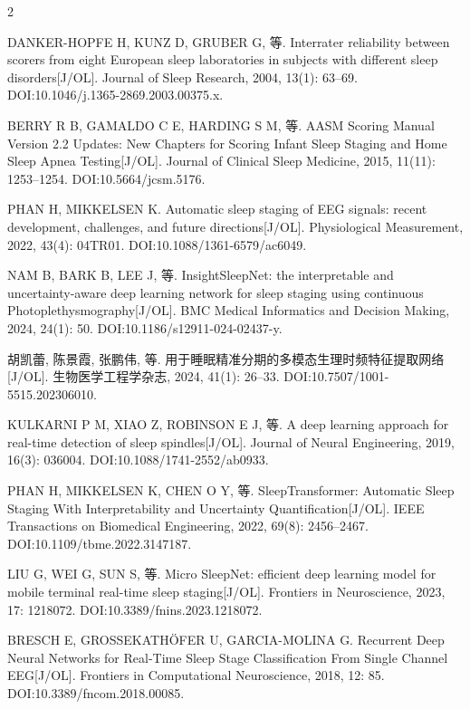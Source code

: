 \documentclass[UTF8,zihao=5,fontset=none]{ctexart}
\begin{document}
\begin{multicols}{2}
{\makebox[25.2pt][l]{[28]}DANKER-HOPFE H, KUNZ D, GRUBER G, 等. Interrater reliability between scorers from eight European sleep laboratories in subjects with different sleep disorders[J/OL]. Journal of Sleep Research, 2004, 13(1): 63--69. DOI:10.1046/j.1365-2869.2003.00375.x.\par
\makebox[25.2pt][l]{[29]}BERRY R B, GAMALDO C E, HARDING S M, 等. AASM Scoring Manual Version 2.2 Updates: New Chapters for Scoring Infant Sleep Staging and Home Sleep Apnea Testing[J/OL]. Journal of Clinical Sleep Medicine, 2015, 11(11): 1253--1254. DOI:10.5664/jcsm.5176.\par
\makebox[25.2pt][l]{[30]}PHAN H, MIKKELSEN K. Automatic sleep staging of EEG signals: recent development, challenges, and future directions[J/OL]. Physiological Measurement, 2022, 43(4): 04TR01. DOI:10.1088/1361-6579/ac6049.\par
\makebox[25.2pt][l]{[31]}NAM B, BARK B, LEE J, 等. InsightSleepNet: the interpretable and uncertainty-aware deep learning network for sleep staging using continuous Photoplethysmography[J/OL]. BMC Medical Informatics and Decision Making, 2024, 24(1): 50. DOI:10.1186/s12911-024-02437-y.\par
\makebox[25.2pt][l]{[32]}胡凯蕾, 陈景霞, 张鹏伟, 等. 用于睡眠精准分期的多模态生理时频特征提取网络[J/OL]. 生物医学工程学杂志, 2024, 41(1): 26--33. DOI:10.7507/1001-5515.202306010.\par
\makebox[25.2pt][l]{[33]}KULKARNI P M, XIAO Z, ROBINSON E J, 等. A deep learning approach for real-time detection of sleep spindles[J/OL]. Journal of Neural Engineering, 2019, 16(3): 036004. DOI:10.1088/1741-2552/ab0933.\par
\makebox[25.2pt][l]{[34]}PHAN H, MIKKELSEN K, CHEN O Y, 等. SleepTransformer: Automatic Sleep Staging With Interpretability and Uncertainty Quantification[J/OL]. IEEE Transactions on Biomedical Engineering, 2022, 69(8): 2456--2467. DOI:10.1109/tbme.2022.3147187.\par
\makebox[25.2pt][l]{[35]}LIU G, WEI G, SUN S, 等. Micro SleepNet: efficient deep learning model for mobile terminal real-time sleep staging[J/OL]. Frontiers in Neuroscience, 2023, 17: 1218072. DOI:10.3389/fnins.2023.1218072.\par
\makebox[25.2pt][l]{[36]}BRESCH E, GROSSEKATHÖFER U, GARCIA-MOLINA G. Recurrent Deep Neural Networks for Real-Time Sleep Stage Classification From Single Channel EEG[J/OL]. Frontiers in Computational Neuroscience, 2018, 12: 85. DOI:10.3389/fncom.2018.00085.\par
}
\end{multicols}
\end{document}
